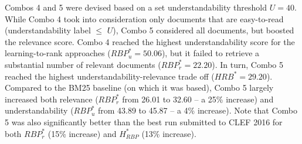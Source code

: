 Combos 4 and 5 were devised based on a set understandability threshold $U=40$. While Combo 4 took into consideration only documents that are easy-to-read (understandability label $\le$ $U$), Combo 5 considered all documents, but boosted the relevance score. Combo 4 reached the highest understandability score for the learning-to-rank approaches ($RBP_u^{*}=50.06$), but it failed to retrieve a substantial number of relevant documents ($RBP_r^{*}=22.20$). In turn, Combo 5 reached the highest understandability-relevance trade off ($HRB^{*}=29.20$). Compared to the BM25 baseline (on which it was based), Combo 5  largely increased both relevance ($RBP_r^*$ from 26.01 to 32.60 -- a 25\% increase) and understandability ($RBP_u^*$ from 43.89 to 45.87 -- a 4\% increase). Note that Combo 5 was also significantly better than the best run submitted to CLEF 2016 for both $RBP_r^{*}$ (15\% increase) and $H_{RBP}^{*}$ (13\% increase).


